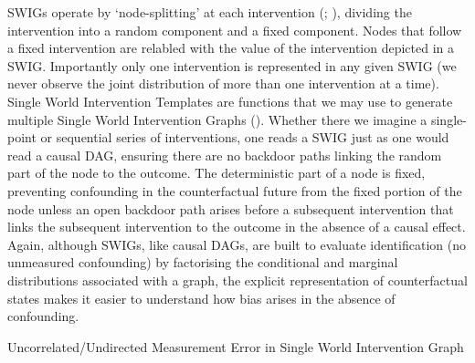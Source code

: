 \documentclass[
  single column]{article}
\begin{document}
SWIGs operate by `node-splitting' at each intervention
(;
), dividing
the intervention into a random component and a fixed component. Nodes
that follow a fixed intervention are relabled with the value of the
intervention depicted in a SWIG. Importantly only one intervention is
represented in any given SWIG (we never observe the joint distribution
of more than one intervention at a time). Single World Intervention
Templates are functions that we may use to generate multiple Single
World Intervention Graphs
().
Whether there we imagine a single-point or sequential series of
interventions, one reads a SWIG just as one would read a causal DAG,
ensuring there are no backdoor paths linking the random part of the node
to the outcome. The deterministic part of a node is fixed, preventing
confounding in the counterfactual future from the fixed portion of the
node unless an open backdoor path arises before a subsequent
intervention that links the subsequent intervention to the outcome in
the absence of a causal effect. Again, although SWIGs, like causal DAGs,
are built to evaluate identification (no unmeasured confounding) by
factorising the conditional and marginal distributions associated with a
graph, the explicit representation of counterfactual states makes it
easier to understand how bias arises in the absence of confounding.

\begin{table}

\caption{\label{tbl-tblme}Uncorrelated/Undirected Measurement Error in
Single World Intervention Graph}

\centering{

\tblme

}

\end{table}%
\end{document}
